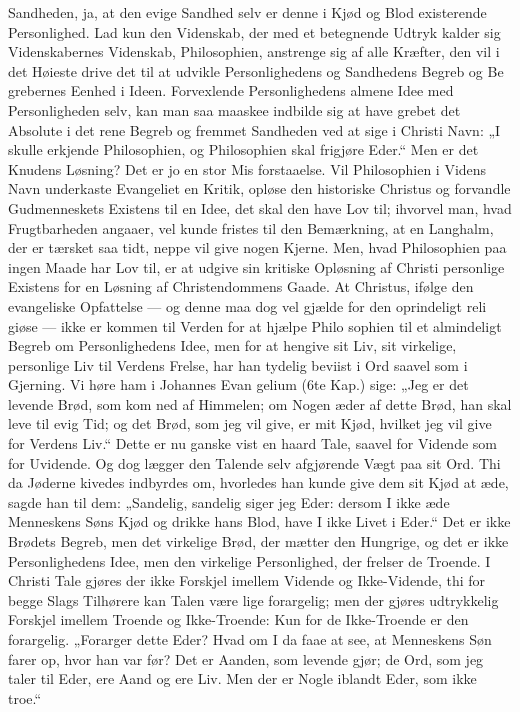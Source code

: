 \documentclass[12pt]{book}
\newcommand{\opage}[1]{\marginnote{\footnotesize\textit{[#1]}}}
\begin{document}
Sandheden, ja, at den evige Sandhed selv er denne i
Kjød og Blod existerende Personlighed. Lad kun den
Videnskab, der med et betegnende Udtryk kalder sig
Videnskabernes Videnskab, Philosophien, anstrenge sig
af alle Kræfter, den vil i det Høieste drive det til at
udvikle Personlighedens og Sandhedens Begreb og Be\-%
grebernes Eenhed i Ideen. Forvexlende Personlighedens
almene Idee med Personligheden selv, kan man saa maaskee
indbilde sig at have grebet det Absolute i det rene Begreb
og fremmet Sandheden ved at sige i Christi Navn: „I skulle
erkjende Philosophien, og Philosophien skal frigjøre Eder.“
Men er det Knudens Løsning? Det er jo en stor Mis\-%
forstaaelse. Vil Philosophien i Videns Navn underkaste
Evangeliet en Kritik, opløse den historiske Christus og
forvandle Gudmenneskets Existens til en Idee, det skal
den have Lov til; ihvorvel man, hvad Frugtbarheden
angaaer, vel kunde fristes til den Bemærkning, at en
Langhalm, der er tærsket saa tidt, neppe vil give nogen
Kjerne. Men, hvad Philosophien paa ingen Maade har
Lov til, er at udgive sin kritiske Opløsning af Christi
\opage{75}\setcounter{footnote}{0}%
personlige Existens for en Løsning af Christendommens
Gaade. At Christus, ifølge den evangeliske Opfattelse ---
og denne maa dog vel gjælde for den oprindeligt reli\-%
giøse --- ikke er kommen til Verden for at hjælpe Philo\-%
sophien til et almindeligt Begreb om Personlighedens
Idee, men for at hengive sit Liv, sit virkelige, personlige
Liv til Verdens Frelse, har han tydelig beviist i Ord
saavel som i Gjerning. Vi høre ham i Johannes Evan\-%
gelium (6te Kap.) sige: „Jeg er det levende Brød, som
kom ned af Himmelen; om Nogen æder af dette Brød,
han skal leve til evig Tid; og det Brød, som jeg vil
give, er mit Kjød, hvilket jeg vil give for Verdens Liv.“
Dette er nu ganske vist en haard Tale, saavel for Vidende
som for Uvidende. Og dog lægger den Talende selv
afgjørende Vægt paa sit Ord. Thi da Jøderne kivedes
indbyrdes om, hvorledes han kunde give dem sit Kjød
at æde, sagde han til dem: „Sandelig, sandelig siger jeg
Eder: dersom I ikke æde Menneskens Søns Kjød og
drikke hans Blod, have I ikke Livet i Eder.“ Det er
ikke Brødets Begreb, men det virkelige Brød, der mætter
den Hungrige, og det er ikke Personlighedens Idee, men
den virkelige Personlighed, der frelser de Troende. I
Christi Tale gjøres der ikke Forskjel imellem Vidende
og Ikke-Vidende, thi for begge Slags Tilhørere kan
Talen være lige forargelig; men der gjøres udtrykkelig
Forskjel imellem Troende og Ikke-Troende: Kun for
de Ikke-Troende er den forargelig. „Forarger dette
Eder? Hvad om I da faae at see, at Menneskens Søn
farer op, hvor han var før? Det er Aanden, som levende\-%
gjør; de Ord, som jeg taler til Eder, ere Aand og ere
Liv. Men der er Nogle iblandt Eder, som ikke troe.“
\end{document}

